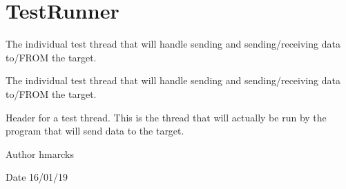 \hypertarget{group__TestRunner}{}\section{Test\+Runner}
\label{group__TestRunner}


The individual test thread that will handle sending and sending/receiving data to/\+F\+R\+OM the target.  


The individual test thread that will handle sending and sending/receiving data to/\+F\+R\+OM the target. 

Header for a test thread. This is the thread that will actually be run by the program that will send data to the target.

\begin{DoxyAuthor}{Author}
hmarcks
\end{DoxyAuthor}
\begin{DoxyDate}{Date}
16/01/19 
\end{DoxyDate}
